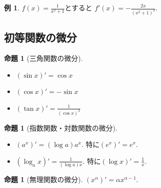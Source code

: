 \documentclass[dvipdfmx,a4paper,11pt]{article}
\theoremstyle{definition}
\newtheorem{prop}[thm]{命題}
\newtheorem{exa}[thm]{例}
\begin{document}
   
  \begin{exa}
$f(x) = \frac{1}{x^{2}+1}$とすると
$f'(x) = - \frac{2x}{(x^2 +1)^2}$.
 \end{exa}
   
 
   
 \subsection{初等関数の微分}

   
 \begin{tcolorbox}[
    colback = white,
    colframe = green!35!black,
    fonttitle = \bfseries,
    breakable = true]
    \begin{prop}[三角関数の微分]
    \text{}
 \begin{itemize}
   \setlength{\parskip}{0cm} 
  \setlength{\itemsep}{0cm}
 \item  $(\sin x)' = \cos x$ 
 \item  $(\cos x)' = -\sin x$
  \item  $(\tan x)' = \frac{1}{(\cos x)^2}$
 \end{itemize}
 \end{prop}
   \end{tcolorbox}

    \begin{tcolorbox}[
    colback = white,
    colframe = green!35!black,
    fonttitle = \bfseries,
    breakable = true]
    \begin{prop}[指数関数・対数関数の微分]
    \text{}
 \begin{itemize}
    \setlength{\parskip}{0cm} 
  \setlength{\itemsep}{0cm}
 \item  $(a^x)' = (\log a) a^x$. 特に$(e^x)' = e^x$.
  \item  $(\log_{a} x)' = \frac{1}{(\log a) x}$. 特に$(\log x)' = \frac{1}{x}$.
 \end{itemize}
 \end{prop}
   \end{tcolorbox}
   
    \begin{tcolorbox}[
    colback = white,
    colframe = green!35!black,
    fonttitle = \bfseries,
    breakable = true]
    \begin{prop}[無理関数の微分]
$(x^{\alpha})' = \alpha x^{\alpha-1}$.
 \end{prop}
   \end{tcolorbox}
   
\end{document}

